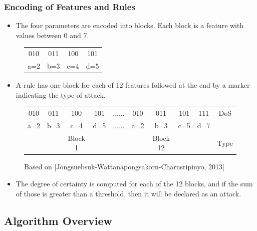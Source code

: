 \documentclass{beamer}
\begin{document}
\begin{frame}
	\frametitle{Encoding of Features and Rules}
	\begin{itemize}
	\item The four parameters are encoded into blocks. Each block is a feature with values between 0 and 7.
	\end{itemize}
	
\begin{figure}
\begin{tabular}{|cccc|} \hline
010 & 011 & 100 & 101\\
a=2 & b=3 & c=4 & d=5\\
\hline\end{tabular}
\end{figure}

	\begin{itemize}
	\item A rule has one block for each of 12 features followed at the end by a marker indicating the type of attack.
	\end{itemize}

\begin{figure}
\begin{small}
\begin{tabular}{|cccc|c|cccc|c|} \hline
010 & 011 & 100 & 101   & ...... & 010 & 011 & 101 & 111   & DoS\\
a=2 & b=3 & c=4 & d=5   & ...... & a=2 & b=3 & c=5 & d=7   &\\ 
    &     & Block 1&    &        &     & Block 12& &       & Type\\
\hline\end{tabular}
\caption{Based on [Jongsuebsuk-Wattanapongsakorn-Charnsripinyo, 2013]}
\end{small}
\end{figure}

	\begin{itemize}
		\item The degree of certainty is computed for each of the 12 blocks, and if the sum of those is greater than a threshold, then it will be declared as an attack.
	\end{itemize}

\end{frame}


\subsection{Algorithm Overview}
\end{document}
